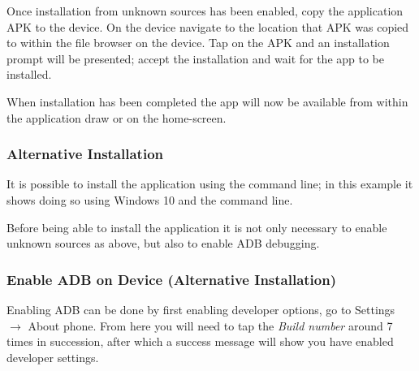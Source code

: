 Once installation from unknown sources has been enabled, copy the
application APK to the device. On the device navigate to the location
that APK was copied to within the file browser on the device. Tap on the
APK and an installation prompt will be presented; accept the
installation and wait for the app to be installed.

When installation has been completed the app will now be available from
within the application draw or on the home-screen.

\subsubsection{Alternative Installation}\label{alternative-installation}

It is possible to install the application using the command line; in
this example it shows doing so using Windows 10 and the command line.

Before being able to install the application it is not only necessary to
enable unknown sources as above, but also to enable ADB debugging.

\subsubsection{Enable ADB on Device (Alternative
Installation)}\label{enable-adb-on-device-alternative-installation}

Enabling ADB can be done by first enabling developer options, go to
Settings \(\rightarrow\) About phone. From here you will need to tap the
\emph{Build number} around 7 times in succession, after which a success
message will show you have enabled developer settings.

